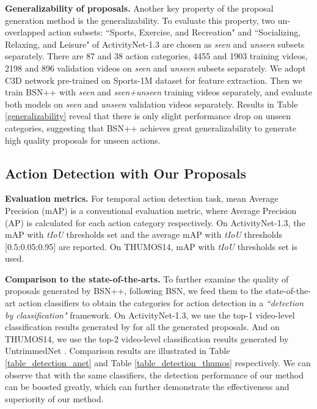 \documentclass[letterpaper]{article} \usepackage{aaai21}  \usepackage{times}  \usepackage{helvet} \usepackage{courier}  \usepackage[hyphens]{url}  \usepackage{graphicx} \urlstyle{rm} \def\UrlFont{\rm}  \usepackage{natbib}  \usepackage{amsmath,amssymb} \usepackage{caption} \frenchspacing  \usepackage{color}
\begin{document}
\noindent
\textbf{Generalizability of proposals.} Another key property of the proposal generation method is the generalizability. To evaluate this property, two un-overlapped action subsets: ``Sports, Exercise, and Recreation" and ``Socializing, Relaxing, and Leisure" of ActivityNet-1.3 are chosen as \textit{seen} and \textit{unseen} subsets separately. There are 87 and 38 action categories, 4455 and 1903 training videos, 2198 and 896 validation videos on \textit{seen} and \textit{unseen} subsets separately. We adopt C3D network pre-trained on Sports-1M dataset for feature extraction. Then we train BSN++ with \textit{seen} and \textit{seen+unseen} training videos separately, and evaluate both models on \textit{seen} and \textit{unseen} validation videos separately. Results in Table \ref{generalizability} reveal that there is only slight performance drop on unseen categories, suggesting that BSN++ achieves great generalizability to generate high quality proposals for unseen actions.



\subsection{Action Detection with Our Proposals}
\noindent
\textbf{Evaluation metrics.} For temporal action detection task, mean Average Precision (mAP) is a conventional evaluation metric, where Average Precision (AP) is calculated for each action category respectively. On ActivityNet-1.3, the mAP with \textit{tIoU} thresholds set  and the average mAP with \textit{tIoU} thresholds [0.5:0.05:0.95] are reported. On THUMOS14, mAP with \textit{tIoU} thresholds set  is used.

\noindent
\textbf{Comparison to the state-of-the-arts.}
To further examine the quality of proposals generated by BSN++, following BSN\cite{BSN}, we feed them to the state-of-the-art action classifiers to obtain the categories for action detection in a \textit{``detection by classification"} framework. On ActivityNet-1.3, we use the top-1 video-level classification results generated by \cite{xiong2016cuhk} for all the generated proposals. And on THUMOS14, we use the top-2 video-level classification results generated by UntrimmedNet \cite{L.Wang}. Comparison results are illustrated in Table \ref{table_detection_anet} and Table \ref{table_detection_thumos} respectively. We can observe that with the same classifiers, the detection performance of our method can be boosted greatly, which can further demonstrate the effectiveness and superiority of our method.
\end{document}
